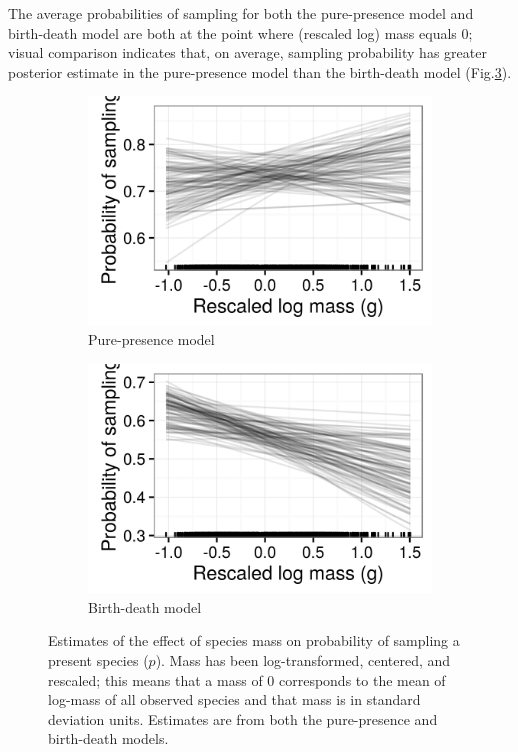 \documentclass[12pt,letterpaper]{article}
\begin{document}
The average probabilities of sampling for both the pure-presence model and birth-death model are both at the point where (rescaled log) mass equals 0; visual comparison indicates that, on average, sampling probability has greater posterior estimate in the pure-presence model than the birth-death model (Fig.\ref{fig:mass_preserve}).

\begin{figure}[ht]
  \begin{subfigure}[b]{0.45\textwidth}
    \includegraphics[width=\textwidth,height=0.5\textheight,keepaspectratio=true]{figure/mass_on_samp}
    \caption{Pure-presence model}
    \label{fig:mass_preserve_pure_pres}
  \end{subfigure}
  \begin{subfigure}[b]{0.45\textwidth}
    \includegraphics[width=\textwidth,height=0.5\textheight,keepaspectratio=true]{figure/mass_on_samp_bd}
    \caption{Birth-death model}
    \label{fig:mass_preserve_bd}
  \end{subfigure}
  \caption[Estimates of the effect of mass on observation probability]{Estimates of the effect of species mass on probability of sampling a present species (\(p\)). Mass has been log-transformed, centered, and rescaled; this means that a mass of 0 corresponds to the mean of log-mass of all observed species and that mass is in standard deviation units. Estimates are from both the pure-presence and birth-death models.}
  \label{fig:mass_preserve}
\end{figure}
\end{document}
